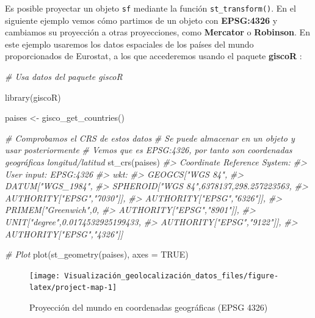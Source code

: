 \documentclass[
]{report}
\newenvironment{Shaded}{\begin{snugshade}}{\end{snugshade}}
\newcommand{\AttributeTok}[1]{\textcolor[rgb]{0.77,0.63,0.00}{#1}}
\newcommand{\CommentTok}[1]{\textcolor[rgb]{0.56,0.35,0.01}{\textit{#1}}}
\newcommand{\ConstantTok}[1]{\textcolor[rgb]{0.00,0.00,0.00}{#1}}
\newcommand{\FunctionTok}[1]{\textcolor[rgb]{0.00,0.00,0.00}{#1}}
\newcommand{\NormalTok}[1]{#1}
\newcommand{\OtherTok}[1]{\textcolor[rgb]{0.56,0.35,0.01}{#1}}
\theoremstyle{definition}
\theoremstyle{definition}
\theoremstyle{definition}
\theoremstyle{definition}
\theoremstyle{remark}
\begin{document}
Es posible proyectar un objeto \texttt{sf} mediante la función \texttt{st\_transform()}. En el
siguiente ejemplo vemos cómo partimos de un objeto con \textbf{EPSG:4326} y cambiamos
su proyección a otras proyecciones, como \textbf{Mercator} o \textbf{Robinson}. En este
ejemplo usaremos los datos espaciales de los países del mundo proporcionados de
Eurostat, a los que accederemos usando el paquete \textbf{giscoR} \citep{R-giscor} :

\begin{Shaded}
\begin{Highlighting}[]

\CommentTok{\# Usa datos del paquete giscoR}

\FunctionTok{library}\NormalTok{(giscoR)}

\NormalTok{paises }\OtherTok{\textless{}{-}} \FunctionTok{gisco\_get\_countries}\NormalTok{()}

\CommentTok{\# Comprobamos el CRS de estos datos}
\CommentTok{\# Se puede almacenar en un objeto y usar posteriormente}
\CommentTok{\# Vemos que es EPSG:4326, por tanto son coordenadas geográficas longitud/latitud}
\FunctionTok{st\_crs}\NormalTok{(paises)}
\CommentTok{\#\textgreater{} Coordinate Reference System:}
\CommentTok{\#\textgreater{}   User input: EPSG:4326 }
\CommentTok{\#\textgreater{}   wkt:}
\CommentTok{\#\textgreater{} GEOGCS["WGS 84",}
\CommentTok{\#\textgreater{}     DATUM["WGS\_1984",}
\CommentTok{\#\textgreater{}         SPHEROID["WGS 84",6378137,298.257223563,}
\CommentTok{\#\textgreater{}             AUTHORITY["EPSG","7030"]],}
\CommentTok{\#\textgreater{}         AUTHORITY["EPSG","6326"]],}
\CommentTok{\#\textgreater{}     PRIMEM["Greenwich",0,}
\CommentTok{\#\textgreater{}         AUTHORITY["EPSG","8901"]],}
\CommentTok{\#\textgreater{}     UNIT["degree",0.0174532925199433,}
\CommentTok{\#\textgreater{}         AUTHORITY["EPSG","9122"]],}
\CommentTok{\#\textgreater{}     AUTHORITY["EPSG","4326"]]}

\CommentTok{\# Plot}
\FunctionTok{plot}\NormalTok{(}\FunctionTok{st\_geometry}\NormalTok{(paises), }\AttributeTok{axes =} \ConstantTok{TRUE}\NormalTok{)}
\end{Highlighting}
\end{Shaded}

\begin{figure}

{\centering \texttt{[image: Visualización\_geolocalización\_datos\_files/figure-latex/project-map-1]} 

}

\caption{Proyección del mundo en coordenadas geográficas (EPSG 4326)}\label{fig:project-map-1}
\end{figure}
\end{document}
